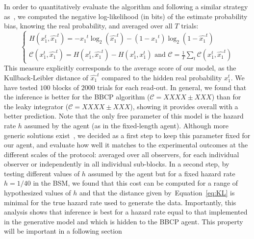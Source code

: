 \documentclass[12pt,english]{article}%
\newcommand{\choice}[1]{ %
	\left\{ %
		\begin{array}{l} #1 \end{array} %
	\right. }
\newcommand{\eql}[1]{\begin{equation}#1\end{equation}}
\newcommand{\Cc}{\mathcal{C}}
\newcommand{\citep}[1]{\parencite{#1}}
\newcommand{\seeEq}[1]{Equation~\ref{eq:#1}}
\begin{document}
In order to quantitatively evaluate the algorithm and following a similar strategy as~\citep{Norton18},
we computed the negative log-likelihood (in bits) of the estimate probability bias,
knowing the real probability,
and averaged over all $T$ trials:
\eql{
\choice{
H(x_1^t, \hat{x_1}^t ) = - {x_1}^t \log_2( \hat{x_1}^t ) - (1-{x_1}^t) \log_2( 1- \hat{x_1}^t) \\
\Cc(x_1^t, \hat{x_1}^t) = H(x_1^t, \hat{x_1}^t ) - H(x_1^t, x_1^t ) \text{ and } \Cc = \frac 1 T  \sum_t \Cc(x_1^t, \hat{x_1}^t)
}
\label{eq:KL}
}
This measure explicitly corresponds to the average score of our model,
as the Kullback-Leibler distance of $\hat{x_1}^t$ %
compared to the hidden real probability $x_1^t$.
We have tested $100$ blocks of $2000$ trials for each read-out.
In general, we found that the inference is better for the BBCP algorithm ($\Cc = XXXX \pm XXX$)
than for the leaky integrator ($\Cc = XXXX \pm XXX$), showing it provides overall with a better prediction.
Note that the only free parameter of this model is the hazard rate $h$
assumed by the agent (as in the fixed-length agent).
Although more generic solutions exist~\citep{Wilson13,Wilson18},
we decided as a first step to keep this parameter fixed for our agent, 
and  evaluate how well it matches to the experimental outcomes at the different scales of the protocol:
averaged over all observers, for each individual observer or independently in all individual sub-blocks.
In a second step, by testing different values of $h$ assumed by the agent
but for a fixed hazard rate $h=1/40$ in the BSM,
we found that this cost can be computed for a range of hypothesized values of $h$ 
and that the distance given by~\seeEq{KL} is minimal 
for the true hazard rate used to generate the data.
Importantly, this analysis shows that inference is best for a hazard rate
equal to that implemented in the generative model and which is hidden to the BBCP agent.
This property will be important in a following section 
\end{document}
